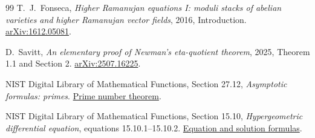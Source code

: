 \documentclass[11pt,a4paper]{article}
\begin{document}
\begin{thebibliography}{99}
T.~J.~Fonseca, \emph{Higher Ramanujan equations I: moduli stacks of abelian
varieties and higher Ramanujan vector fields}, 2016, Introduction.
\href{https://arxiv.org/abs/1612.05081}{arXiv:1612.05081}.

D.~Savitt, \emph{An elementary proof of Newman's eta-quotient theorem},
2025, Theorem 1.1 and Section 2.
\href{https://arxiv.org/abs/2507.16225}{arXiv:2507.16225}.

NIST Digital Library of Mathematical Functions,
Section 27.12, \emph{Asymptotic formulas: primes}.
\href{https://dlmf.nist.gov/27.12}{Prime number theorem}.

 NIST Digital Library of Mathematical Functions, Section 15.10, \emph{Hypergeometric differential equation}, equations 15.10.1--15.10.2. \href{https://dlmf.nist.gov/15.10}{Equation and solution formulas}.
\end{thebibliography}
\end{document}
